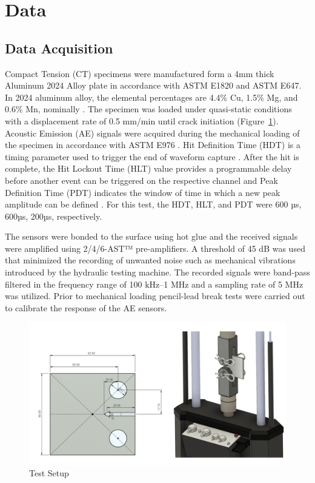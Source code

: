 \documentclass[conference]{IEEEtran}
\begin{document}
\section{Data}
\subsection{Data Acquisition}
Compact Tension (CT) specimens were manufactured form a 4mm thick Aluminum 2024 Alloy plate in accordance with ASTM E1820 and ASTM E647\cite{b5,b6}. In 2024 aluminum alloy, the elemental percentages are 4.4\% Cu, 1.5\% Mg, and 0.6\% Mn, nominally \cite{b7}. The specimen was loaded under quasi-static conditions with a displacement rate of 0.5 mm/min until crack initiation (Figure~\ref{setup}). Acoustic Emission (AE) signals were acquired during the mechanical loading of the specimen in accordance with ASTM E976 \cite{b8}. Hit Definition Time (HDT) is a timing parameter used to trigger the end of waveform capture \cite{b9}. After the hit is complete, the Hit Lockout Time (HLT) value provides a programmable delay before another event can be triggered on the respective channel and Peak Definition Time (PDT) indicates the window of time in which a new peak amplitude can be defined \cite{b9}. For this test, the HDT, HLT, and PDT were 600 µs, 600µs, 200µs, respectively.  

The sensors were bonded to the surface using hot glue and the received signals were amplified using 2/4/6-AST™ pre-amplifiers. A threshold of 45 dB was used that minimized the recording of unwanted noise such as mechanical vibrations introduced by the hydraulic testing machine. The recorded signals were band-pass filtered in the frequency range of 100 kHz–1 MHz and a sampling rate of 5 MHz was utilized. Prior to mechanical loading pencil-lead break tests were carried out to calibrate the response of the AE sensors. 

\begin{figure}[htbp]
\centerline{\includegraphics[width=.5\textwidth]{images/setup.png}}
\caption{Test Setup}
\label{setup}
\end{figure}
\end{document}
